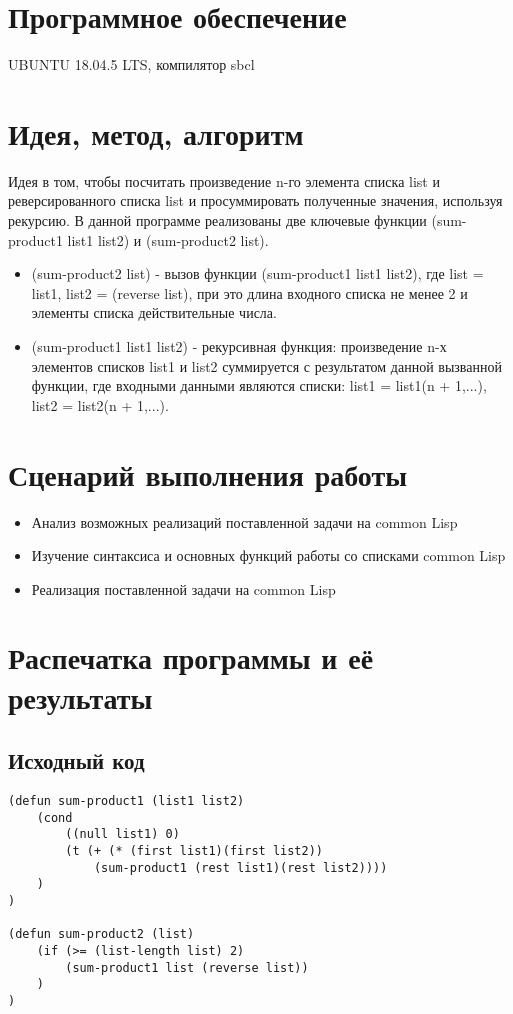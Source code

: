 \documentclass[12pt]{article}
\begin{document}
\section{Программное обеспечение}
UBUNTU 18.04.5 LTS, компилятор sbcl

\section{Идея, метод, алгоритм}
Идея в том, чтобы посчитать произведение n-го элемента списка list и реверсированного списка list и просуммировать полученные значения, используя рекурсию. В данной программе реализованы две ключевые функции (sum-product1 list1 list2) и (sum-product2 list).
\begin{itemize}
\setlength{\itemsep}{-1mm} %
\item (sum-product2 list) - вызов функции (sum-product1 list1 list2), где list = list1, list2 = (reverse list), при это длина входного списка не менее 2 и элементы списка действительные числа.
\item (sum-product1 list1 list2) - рекурсивная функция: произведение n-х элементов списков  list1 и list2  суммируется с результатом данной вызванной функции, где входными данными являются списки: list1 = list1(n + 1,...), list2 = list2(n + 1,...).
\end{itemize}

\section{Сценарий выполнения работы}
\begin{itemize}
\setlength{\itemsep}{-1mm}
\item Анализ возможных реализаций поставленной задачи на common Lisp
\item Изучение синтаксиса и основных функций работы со списками common Lisp
\item Реализация поставленной задачи на common Lisp
\end{itemize}
\section{Распечатка программы и её результаты}

\subsection{Исходный код}
\begin{verbatim}
(defun sum-product1 (list1 list2)
    (cond 
        ((null list1) 0)
        (t (+ (* (first list1)(first list2))
            (sum-product1 (rest list1)(rest list2))))
    )
)

(defun sum-product2 (list)
    (if (>= (list-length list) 2)
        (sum-product1 list (reverse list))
    )
)
\end{verbatim}
%
\end{document}
